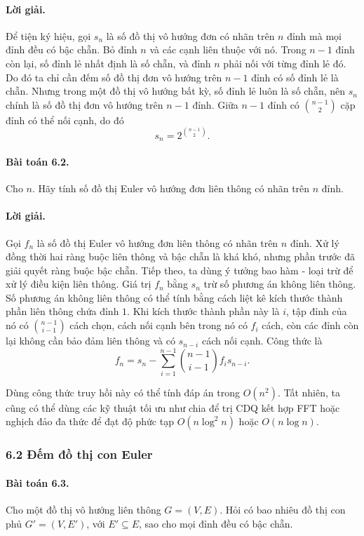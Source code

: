 \documentclass[11pt]{article}
\begin{document}
\paragraph{Lời giải.}
Để tiện ký hiệu, gọi \(s_n\) là số đồ thị vô hướng đơn có nhãn trên \(n\) đỉnh
mà mọi đỉnh đều có bậc chẵn. Bỏ đỉnh \(n\) và các cạnh liên thuộc với nó. Trong
\(n-1\) đỉnh còn lại, số đỉnh lẻ nhất định là số chẵn, và đỉnh \(n\) phải nối
với từng đỉnh lẻ đó. Do đó ta chỉ cần đếm số đồ thị đơn vô hướng trên \(n-1\)
đỉnh có số đỉnh lẻ là chẵn. Nhưng trong một đồ thị vô hướng bất kỳ, số đỉnh lẻ
luôn là số chẵn, nên \(s_n\) chính là số đồ thị đơn vô hướng trên \(n-1\) đỉnh.
Giữa \(n-1\) đỉnh có \(\binom{n-1}{2}\) cặp đỉnh có thể nối cạnh, do đó
\[
  s_n=2^{\binom{n-1}{2}}.
\]

\paragraph{Bài toán 6.2.}
Cho \(n\). Hãy tính số đồ thị Euler vô hướng đơn liên thông có nhãn trên
\(n\) đỉnh.

\paragraph{Lời giải.}
Gọi \(f_n\) là số đồ thị Euler vô hướng đơn liên thông có nhãn trên \(n\) đỉnh.
Xử lý đồng thời hai ràng buộc liên thông và bậc chẵn là khá khó, nhưng phần
trước đã giải quyết ràng buộc bậc chẵn. Tiếp theo, ta dùng ý tưởng bao hàm -
loại trừ để xử lý điều kiện liên thông. Giá trị \(f_n\) bằng \(s_n\) trừ số
phương án không liên thông. Số phương án không liên thông có thể tính bằng cách
liệt kê kích thước thành phần liên thông chứa đỉnh \(1\). Khi kích thước thành
phần này là \(i\), tập đỉnh của nó có \(\binom{n-1}{i-1}\) cách chọn, cách nối
cạnh bên trong nó có \(f_i\) cách, còn các đỉnh còn lại không cần bảo đảm liên
thông và có \(s_{n-i}\) cách nối cạnh. Công thức là
\[
  f_n=s_n-\sum_{i=1}^{n-1}\binom{n-1}{i-1}f_i s_{n-i}.
\]

Dùng công thức truy hồi này có thể tính đáp án trong \(O(n^2)\). Tất nhiên, ta
cũng có thể dùng các kỹ thuật tối ưu như chia để trị CDQ kết hợp FFT hoặc
nghịch đảo đa thức để đạt độ phức tạp \(O(n\log^2 n)\) hoặc \(O(n\log n)\).

\subsubsection*{6.2 Đếm đồ thị con Euler}

\paragraph{Bài toán 6.3.}
Cho một đồ thị vô hướng liên thông \(G=(V,E)\). Hỏi có bao nhiêu đồ thị con phủ
\(G'=(V,E')\), với \(E'\subseteq E\), sao cho mọi đỉnh đều có bậc chẵn.
\end{document}

